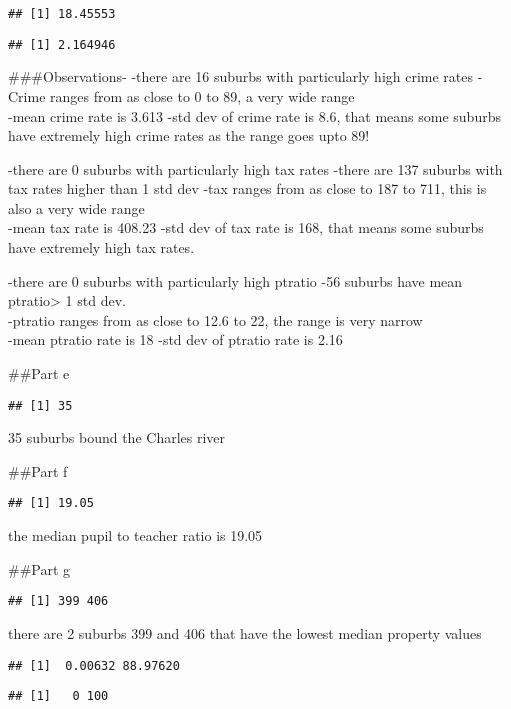 \documentclass[
]{article}
\begin{document}
\begin{verbatim}
## [1] 18.45553
\end{verbatim}

\begin{verbatim}
## [1] 2.164946
\end{verbatim}

\#\#\#Observations- -there are 16 suburbs with particularly high crime
rates -Crime ranges from as close to 0 to 89, a very wide range\\
-mean crime rate is 3.613 -std dev of crime rate is 8.6, that means some
suburbs have extremely high crime rates as the range goes upto 89!

-there are 0 suburbs with particularly high tax rates -there are 137
suburbs with tax rates higher than 1 std dev -tax ranges from as close
to 187 to 711, this is also a very wide range\\
-mean tax rate is 408.23 -std dev of tax rate is 168, that means some
suburbs have extremely high tax rates.

-there are 0 suburbs with particularly high ptratio -56 suburbs have
mean ptratio\textgreater{} 1 std dev.\\
-ptratio ranges from as close to 12.6 to 22, the range is very narrow\\
-mean ptratio rate is 18 -std dev of ptratio rate is 2.16

\#\#Part e

\begin{verbatim}
## [1] 35
\end{verbatim}

35 suburbs bound the Charles river

\#\#Part f

\begin{verbatim}
## [1] 19.05
\end{verbatim}

the median pupil to teacher ratio is 19.05

\#\#Part g

\begin{verbatim}
## [1] 399 406
\end{verbatim}

there are 2 suburbs 399 and 406 that have the lowest median property
values

\begin{verbatim}
## [1]  0.00632 88.97620
\end{verbatim}

\begin{verbatim}
## [1]   0 100
\end{verbatim}
\end{document}

